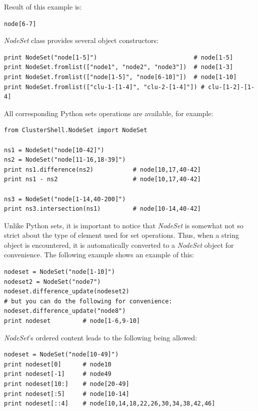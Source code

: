 \documentclass[english,a4paper]{csuserguide}
\newcommand{\NodeSet}{\textit{NodeSet}\xspace}
\begin{document}
Result of this example is:
\medskip
\begin{lstlisting}[breaklines=true, breakatwhitespace=true]
node[6-7]
\end{lstlisting}

\NodeSet class provides several object constructors:
\medskip
\begin{lstlisting}[breaklines=true, breakatwhitespace=true]
print NodeSet("node[1-5]")                           # node[1-5]
print NodeSet.fromlist(["node1", "node2", "node3"])  # node[1-3]
print NodeSet.fromlist(["node[1-5]", "node[6-10]"])  # node[1-10]
print NodeSet.fromlist(["clu-1-[1-4]", "clu-2-[1-4]"]) # clu-[1-2]-[1-4]
\end{lstlisting}

All corresponding Python sets operations are available, for example:
\medskip
\begin{lstlisting}[breaklines=true, breakatwhitespace=true]
from ClusterShell.NodeSet import NodeSet

ns1 = NodeSet("node[10-42]")
ns2 = NodeSet("node[11-16,18-39]")
print ns1.difference(ns2)           # node[10,17,40-42]
print ns1 - ns2                     # node[10,17,40-42]

ns3 = NodeSet("node[1-14,40-200]")
print ns3.intersection(ns1)         # node[10-14,40-42]
\end{lstlisting}

Unlike Python sets, it is important to notice that \NodeSet is somewhat not so strict about the type of element used for set operations. Thus, when a string object is encountered, it is automatically converted to a \NodeSet object for convenience. The following example shows an example of this:
\medskip
\begin{lstlisting}[breaklines=true, breakatwhitespace=true]
nodeset = NodeSet("node[1-10]")
nodeset2 = NodeSet("node7")
nodeset.difference_update(nodeset2)
# but you can do the following for convenience:
nodeset.difference_update("node8")
print nodeset         # node[1-6,9-10]
\end{lstlisting}

\medskip

\NodeSet's ordered content leads to the following being allowed:

\medskip
\begin{lstlisting}[breaklines=true, breakatwhitespace=true]
nodeset = NodeSet("node[10-49]")
print nodeset[0]      # node10
print nodeset[-1]     # node49
print nodeset[10:]    # node[20-49]
print nodeset[:5]     # node[10-14]
print nodeset[::4]    # node[10,14,18,22,26,30,34,38,42,46]
\end{lstlisting}
\end{document}
